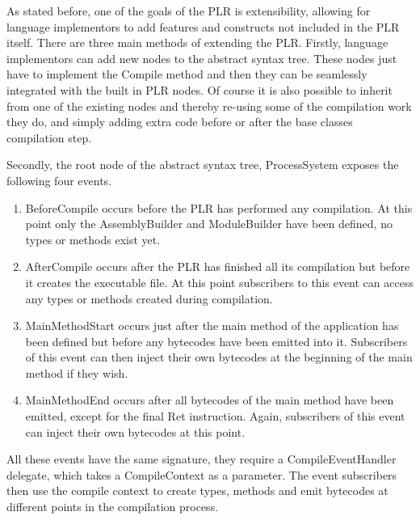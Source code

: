 	As stated before, one of the goals of the PLR is extensibility, allowing
	for language implementors to add features and constructs not included in
	the PLR itself. There are three main methods of extending the PLR. Firstly,
	language implementors can add new nodes to the abstract syntax tree. These
	nodes just have to implement the \textsf{Compile} method and then they can
	be seamlessly integrated with the built in PLR nodes. Of course it is also
	possible to inherit from one of the existing nodes and thereby re-using some
	of the compilation work they do, and simply adding extra code before or after
	the base classes compilation step. 
	
	Secondly, the root node of the abstract	syntax tree, \textsf{ProcessSystem} 
	exposes the following four events. 
	
	\begin{enumerate}
		\item \textsf{BeforeCompile} occurs before the PLR has performed any 
		compilation. At this point only the \textsf{AssemblyBuilder} and 
		\textsf{ModuleBuilder} have been defined, no types or methods exist yet.
		
		\item \textsf{AfterCompile} occurs after the PLR has finished all its
		compilation but before it creates the executable file. At this point
		subscribers to this event can access any types or methods created during
		compilation.
		
		\item \textsf{MainMethodStart} occurs just after the main method of the
		application has been defined but before any bytecodes have been emitted
		into it. Subscribers of this event can then inject their own bytecodes at 
		the beginning of the main method if they wish.
		
		\item \textsf{MainMethodEnd} occurs after all bytecodes of the main method
		have been emitted, except for the final \textsf{Ret} instruction. Again, 
		subscribers of this event can inject their own bytecodes at this point.
	\end{enumerate}
	
	All these events have the same signature, they require a 
	\textsf{CompileEventHandler} delegate, which takes a \textsf{CompileContext} 
	as a parameter. The event subscribers then use the compile context to create 
	types, methods and emit bytecodes at different points in the compilation 
	process.
	
